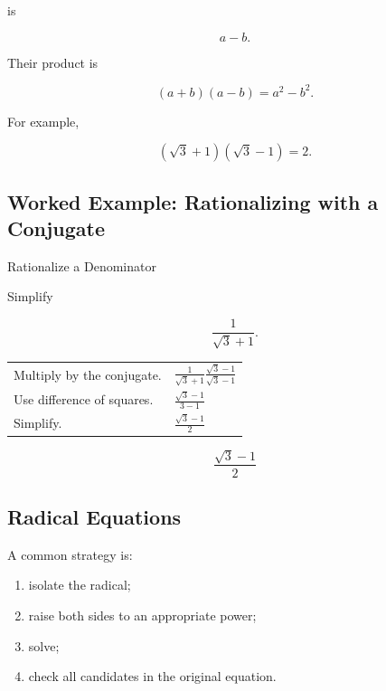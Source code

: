 is

\[ a-b. \]

Their product is

\[ (a+b)(a-b)=a^2-b^2. \]

For example,

\[ (\sqrt3+1)(\sqrt3-1)=2. \]

\subsection{Worked Example: Rationalizing with a Conjugate}
\label{subsec:worked-rationalizing-conjugate}

\begin{workedexamplebox}{Rationalize a Denominator}

Simplify

\[ \frac1{\sqrt3+1}. \]

\begin{tabularx}{\textwidth}{@{}>{\raggedright\arraybackslash}p{}X@{}}
Multiply by the conjugate. &
\(\frac1{\sqrt3+1}\frac{\sqrt3-1}{\sqrt3-1}\)\\
Use difference of squares. &
\(\frac{\sqrt3-1}{3-1}\)\\
Simplify. &
\(\frac{\sqrt3-1}{2}\)
\end{tabularx}

\begin{answerbox}
\[ \frac{\sqrt3-1}{2} \]
\end{answerbox}
\end{workedexamplebox}

\subsection{Radical Equations}
\label{subsec:radical-equations}

A common strategy is:

\begin{enumerate}
    \item isolate the radical;
    \item raise both sides to an appropriate power;
    \item solve;
    \item check all candidates in the original equation.
\end{enumerate}

